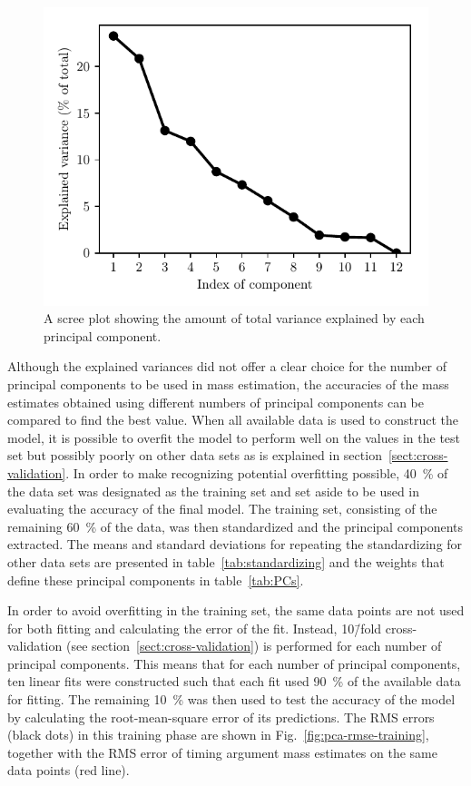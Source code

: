 \documentclass[english, twoside]{HYgradu}
\begin{document}
\begin{figure}
    \centering
    \includegraphics{kuvat/PCA/scree.pdf}
    \caption{A scree plot showing the amount of total variance explained by each principal component.}\label{fig:pca-scree}
\end{figure}


Although the explained variances did not offer a clear choice for the number of principal components to be used in mass estimation, the accuracies of the mass estimates obtained using different numbers of principal components can be compared to find the best value. When all available data is used to construct the model, it is possible to overfit the model to perform well on the values in the test set but possibly poorly on other data sets as is explained in section~\ref{sect:cross-validation}. In order to make recognizing potential overfitting possible, 40~\% of the data set was designated as the training set and set aside to be used in evaluating the accuracy of the final model. The training set, consisting of the remaining 60~\% of the data, was then standardized and the principal components extracted. The means and standard deviations for repeating the standardizing for other data sets are presented in table~\ref{tab:standardizing} and the weights that define these principal components in table~\ref{tab:PCs}.

In order to avoid overfitting in the training set, the same data points are not used for both fitting and calculating the error of the fit. Instead, 10\=/fold cross-validation (see section~\ref{sect:cross-validation}) is performed for each number of principal components. 
This means that for each number of principal components, ten linear fits were constructed such that each fit used 90~\% of the available data for fitting. The remaining 10~\% was then used to test the accuracy of the model by calculating the root-mean-square error of its predictions. The RMS errors (black dots) in this training phase are shown in Fig.~\ref{fig:pca-rmse-training}, together with the RMS error of timing argument mass estimates on the same data points (red line).
\end{document}
